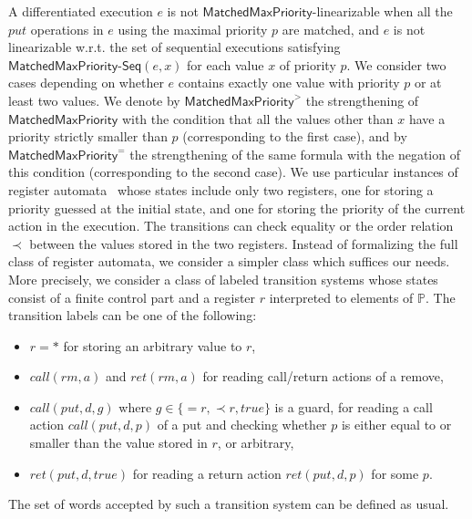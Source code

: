 A differentiated execution $e$ is not $\mathsf{MatchedMaxPriority}$-linearizable when all the $\textit{put}$ operations in $e$ using the maximal priority $p$ are matched, and $e$ is not linearizable w.r.t. the set of sequential executions satisfying $\mathsf{MatchedMaxPriority\text{-}Seq}(e,x)$ for each value $x$ of priority $p$. We consider two cases depending on whether $e$ contains exactly one value with priority $p$ or at least two values. We denote by $\mathsf{MatchedMaxPriority}^{>}$ the strengthening of $\mathsf{MatchedMaxPriority}$ with the condition that all the values other than $x$ have a priority strictly smaller than $p$ (corresponding to the first case), and by $\mathsf{MatchedMaxPriority}^{=}$ the strengthening of the same formula with the negation of this condition (corresponding to the second case).
We use particular instances of register automata~\cite{finite-memory, the paper I found} whose states include only two registers, one for storing a priority guessed at the initial state, and one for storing the priority of the current action in the execution. The transitions can check equality or the order relation $\prec$ between the values stored in the two registers. Instead of formalizing the full class of register automata, we consider a simpler class which suffices our needs. More precisely, we consider a class of labeled transition systems whose states consist of a finite control part and a register $r$ interpreted to elements of $\mathbb{P}$. The transition labels can be one of the following:
\begin{itemize}
	\item $r=*$ for storing an arbitrary value to $r$,
	\item $\textit{call}(\textit{rm},a)$ and $\textit{ret}(\textit{rm},a)$ for reading call/return actions of a remove,
	\item $\textit{call}(\textit{put},d,g)$ where $g\in\{=r,\prec r,true\}$ is a guard, for reading a call action $\textit{call}(\textit{put},d,p)$ of a put and checking whether $p$ is either equal to or smaller than the value stored in $r$, or arbitrary,
	\item $\textit{ret}(\textit{put},d,true)$ for reading a return action $\textit{ret}(\textit{put},d,p)$ for some $p$.
\end{itemize}
The set of words accepted by such a transition system can be defined as usual.

